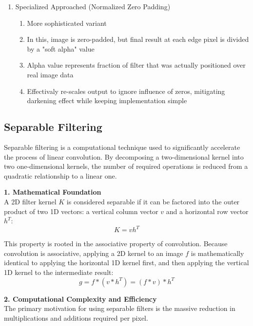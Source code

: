 \documentclass[12pt]{article}
\begin{document}
\begin{enumerate}
\begin{enumerate}
              \item Generally consisted best approach for natural images. Provides smoothest transition and preserves local color and texture statistics of image data at boundaries
          \end{enumerate}
    \item Specialized Approached (Normalized Zero Padding)
          \begin{enumerate}
              \item More sophisticated variant
              \item In this, image is zero-padded, but final result at each edge pixel is divided by a "soft alpha" value
              \item Alpha value represents fraction of filter that was actually positioned over real image data
              \item Effectivaly re-scales output to ignore influence of zeros, mitigating darkening effect while keeping implementation simple
          \end{enumerate}
\end{enumerate}

\subsection{Separable Filtering}

Separable filtering is a computational technique used to significantly accelerate the process of linear convolution. By decomposing a two-dimensional kernel into two one-dimensional kernels, the number of required operations is reduced from a quadratic relationship to a linear one.

\textbf{1. Mathematical Foundation} \\
A 2D filter kernel $K$ is considered separable if it can be factored into the outer product of two 1D vectors: a vertical column vector $v$ and a horizontal row vector $h^T$:
\[
    K = v h^T
\]

This property is rooted in the associative property of convolution. Because convolution is associative, applying a 2D kernel to an image $f$ is mathematically identical to applying the horizontal 1D kernel first, and then applying the vertical 1D kernel to the intermediate result:
\[
    g = f * (v * h^T) = (f * v) * h^T
\]

\textbf{2. Computational Complexity and Efficiency} \\
The primary motivation for using separable filters is the massive reduction in multiplications and additions required per pixel.
\end{document}
